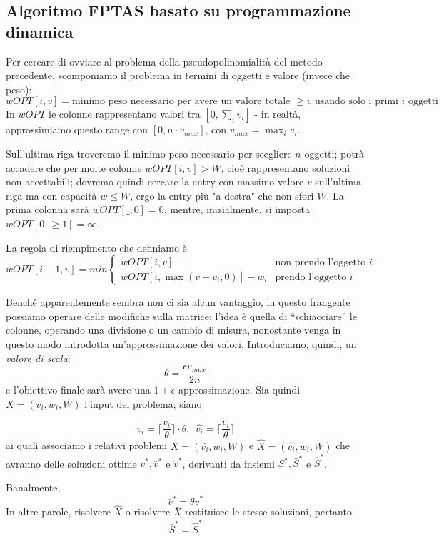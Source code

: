 \subsection{Algoritmo FPTAS basato su programmazione dinamica}
Per cercare di ovviare al problema della pseudopolinomialità del metodo precedente,
scomponiamo il problema in termini di oggetti e valore (invece che peso):
$$
	wOPT[i, v] = \text{minimo peso necessario per avere un valore totale } \geq v \text{ usando solo i primi } i \text { oggetti }
$$
In $wOPT$ le colonne rappresentano valori tra $[0, \sum_{i}v_i]$ - in realtà,
approssimiamo questo range con $[0, n\cdot v_{max}]$, con $v_{max} = \max_i v_i$.

Sull'ultima riga troveremo il minimo peso necessario per scegliere $n$ oggetti;
potrà accadere che per molte colonne $wOPT[i,v] > W$, cioè rappresentano
soluzioni non accettabili; dovremo quindi cercare la entry con massimo valore $v$
sull'ultima riga ma con capacità $w \leq W$, ergo la entry più "a destra" che
non sfori $W$. La prima colonna sarà $wOPT[\_,0] = 0$, mentre, inizialmente,
si imposta $wOPT[0,\geq1] = \infty$.

La regola di riempimento che definiamo è
$$
	wOPT[i+1, v] = min
	\begin{cases}
		wOPT[i, v]						& \text{non prendo l'oggetto } i \\
		wOPT[i, \max(v-v_i, 0)] + w_i	& \text{prendo l'oggetto } i
	\end{cases}
$$

Benché apparentemente sembra non ci sia alcun vantaggio, in questo frangente
possiamo operare delle modifiche sulla matrice: l'idea è quella di ``schiacciare''
le colonne, operando una divisione o un cambio di misura, nonostante venga
in questo modo introdotta un'approssimazione dei valori. Introduciamo,
quindi, un \textit{valore di scala}:
$$
	\theta = \frac{\epsilon v_{max}}{2n}
$$
e l'obiettivo finale sarà avere una $1+\epsilon$-approssimazione.
Sia quindi $X=(v_i, w_i, W)$ l'input del problema; siano

$$
	\bar{v_i} = \lceil\frac{v_i}{\theta}\rceil\cdot \theta, ~~ \hat{v_i} = \lceil \frac{v_i}{\theta}\rceil
$$
ai quali associamo i relativi problemi $\bar{X} = (\bar{v_i}, w_i, W)$
e $\hat{X} = (\hat{v_i}, w_i, W)$
che avranno delle soluzioni ottime $v^*, \bar{v}^*$ e $\hat{v}^*$, derivanti
da insiemi $S^*, \bar{S}^*$ e $\hat{S}^*$.

\begin{oss} \label{oss:knapsack_barv_t_hatv}
	Banalmente,
	$$
		\bar{v}^* = \theta \hat{v}^*
	$$
	In altre parole, risolvere $\hat{X}$ o risolvere $\bar{X}$ restituisce le
	stesse soluzioni, pertanto
	$$
		\bar{S}^* = \hat{S}^*
	$$

\end{oss}

